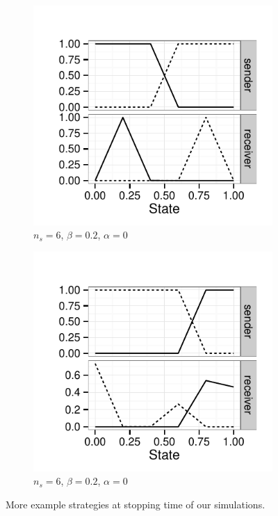 \documentclass[11pt,english]{article}
\newcommand{\imprecision}{\ensuremath{\alpha}} %
\newcommand{\toler}{\ensuremath{\beta}} %
\newcommand{\ns}{\ensuremath{n_s}} %
\numberwithin{equation}{section}
\begin{document}
\begin{figure}
  \centering

  \begin{subfigure}[]{0.45\textwidth}
    \includegraphics[width=\textwidth]{plots/strat_example_ind21.pdf}
    \caption{$\ns = 6$, $\toler = 0.2$, $\imprecision = 0$}
    \label{fig:example_stratsC}
  \end{subfigure}
  \hfill
  \begin{subfigure}[]{0.45\textwidth}
    \includegraphics[width=\textwidth]{plots/strat_example_ind23.pdf}
    \caption{$\ns = 6$, $\toler = 0.2$, $\imprecision = 0$}
    \label{fig:example_stratsD}
  \end{subfigure}

  \caption{More example strategies at stopping time of our simulations.}
  \label{fig:MoreExample_strats}
\end{figure}
\end{document}
